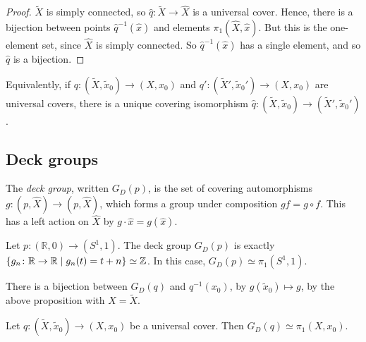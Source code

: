 \begin{proof}
	\( \widetilde X \) is simply connected, so \( \hat q \colon \widetilde X \to \hat X \) is a universal cover.
	Hence, there is a bijection between points \( \hat q^{-1}(\hat x) \) and elements \( \pi_1(\hat X, \hat x) \).
	But this is the one-element set, since \( \hat X \) is simply connected.
	So \( \hat q^{-1}(\hat x) \) has a single element, and so \( \hat q \) is a bijection.
\end{proof}
Equivalently, if \( q \colon (\widetilde X, \widetilde x_0) \to (X, x_0) \) and \( q' \colon (\widetilde X', \widetilde x_0') \to (X, x_0) \) are universal covers, there is a unique covering isomorphism \( \hat q \colon (\widetilde X, \widetilde x_0) \to (\widetilde X', \widetilde x_0') \).

\subsection{Deck groups}
\begin{definition}
	The \emph{deck group}, written \( G_D(p) \), is the set of covering automorphisms \( g \colon (p, \hat X) \to (p, \hat X) \), which forms a group under composition \( gf = g \circ f \).
	This has a left action on \( \hat X \) by \( g \cdot \hat x = g(\hat x) \).
\end{definition}
\begin{example}
	Let \( p \colon (\mathbb R, 0) \to (S^1, 1) \).
	The deck group \( G_D(p) \) is exactly \( \qty{g_n \colon \mathbb R \to \mathbb R \mid g_n(t) = t + n} \simeq \mathbb Z \).
	In this case, \( G_D(p) \simeq \pi_1(S^1, 1) \).
\end{example}
\begin{example}
	There is a bijection between \( G_D(q) \) and \( q^{-1}(x_0) \), by \( g(\widetilde x_0) \mapsto g \), by the above proposition with \( \hat X = \widetilde X \).
\end{example}
\begin{theorem}
	Let \( q \colon (\widetilde X, \widetilde x_0) \to (X, x_0) \) be a universal cover.
	Then \( G_D(q) \simeq \pi_1(X,x_0) \).
\end{theorem}
